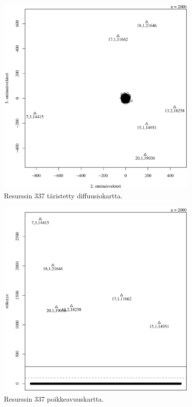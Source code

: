 \begin{figure}[p]
\centering
\includegraphics[width=10cm]{pics/diffuusiokuvat/service_337.pdf}
\caption{Resurssin 337 täristetty diffuusiokartta.}
\label{diffuusio_337}
\end{figure}

\begin{figure}[p]
\centering
\includegraphics[width=10cm]{pics/tiheyskuvat/service_337.pdf}
\caption{Resurssin 337 poikkeavuuskartta.}
\label{service_337}
\end{figure}

